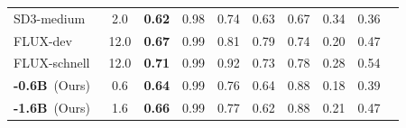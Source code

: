 \begin{table}[htbp]
{{\begin{tabular}{lc|cccccccc}
    SD3-medium~\citep{esser2024scaling}     & 2.0  & \textbf{0.62}   & 0.98   & 0.74   & 0.63   & 0.67  & 0.34 & 0.36 \\
    FLUX-dev~\citep{FLUX}                   & 12.0 & \textbf{0.67}   & 0.99	 & 0.81	  & 0.79   & 0.74  & 0.20 & 0.47 \\
    FLUX-schnell~\citep{FLUX}               & 12.0 & \textbf{0.71}   & 0.99   & 0.92   & 0.73   & 0.78  & 0.28 & 0.54 \\
    \midrule
    \textbf{\model{}-0.6B}~(Ours)                   & 0.6  & \textbf{0.64}   & 0.99   & 0.76   & 0.64   & 0.88  & 0.18 & 0.39 \\ 
    \textbf{\model{}-1.6B}~(Ours)                  & 1.6  & \textbf{0.66}   & 0.99   & 0.77   & 0.62   & 0.88  & 0.21 & 0.47 \\ 
    \bottomrule
    \end{tabular}
    }
    }
    \vspace{1ex}
\end{table}


